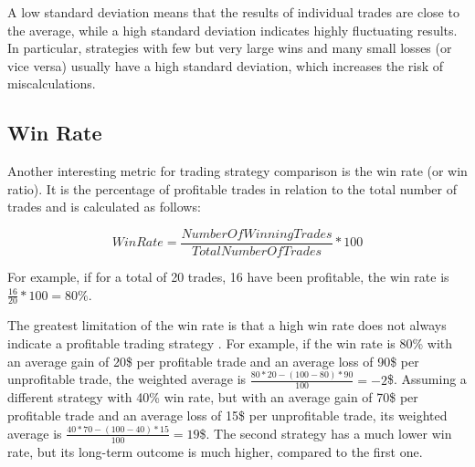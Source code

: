 \noindent
A low standard deviation means that the results of individual trades are close to the average, while a high standard deviation indicates highly fluctuating results.
In particular, strategies with few but very large wins and many small losses (or vice versa) usually have a high standard deviation, which increases the risk of miscalculations.

\subsection{Win Rate}
\label{chap:win-rate}

Another interesting metric for trading strategy comparison is the win rate (or win ratio).
It is the percentage of profitable trades in relation to the total number of trades and is calculated as follows:

\[
    WinRate = \frac{Number Of Winning Trades}{Total Number Of Trades} * 100
\]

\noindent
For example, if for a total of 20 trades, 16 have been profitable, the win rate is $\frac{16}{20} * 100 = 80\%$.

The greatest limitation of the win rate is that a high win rate does not always indicate a profitable trading strategy \cite{win-rate}.
For example, if the win rate is 80\% with an average gain of 20\$ per profitable trade and an average loss of 90\$ per unprofitable trade, the weighted average is $\frac{80 * 20 - (100 - 80) * 90}{100} = -2$\$.
Assuming a different strategy with 40\% win rate, but with an average gain of 70\$ per profitable trade and an average loss of 15\$ per unprofitable trade, its weighted average is $\frac{40 * 70 - (100 - 40) * 15}{100} = 19$\$.
The second strategy has a much lower win rate, but its long-term outcome is much higher, compared to the first one.
